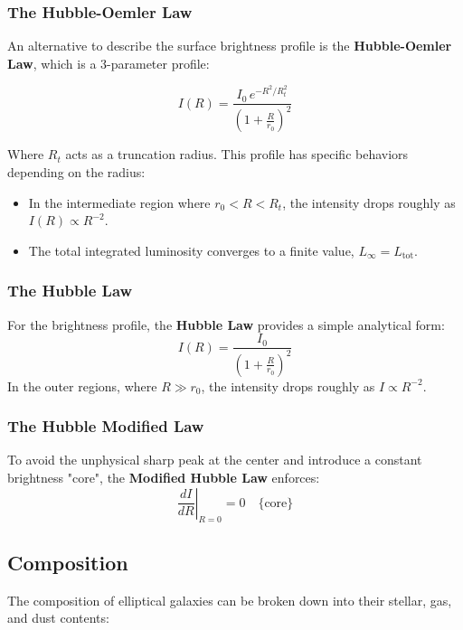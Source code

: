 \subsubsection{The Hubble-Oemler Law}

An alternative to describe the surface brightness profile is the \textbf{Hubble-Oemler Law}, which is a 3-parameter profile:

$$
I(R) = \frac{I_0 \, e^{-R^2/R_t^2}}{\left(1 + \frac{R}{r_0}\right)^2}
$$

Where $R_t$ acts as a truncation radius. This profile has specific behaviors depending on the radius:
\begin{itemize}
    \item In the intermediate region where $r_0 < R < R_t$, the intensity drops roughly as $I(R) \propto R^{-2}$.
    \item The total integrated luminosity converges to a finite value, $L_\infty = L_{\text{tot}}$.
\end{itemize}

\subsubsection{The Hubble Law}

For the brightness profile, the \textbf{Hubble Law} provides a simple analytical form:
$$
I(R) = \frac{I_0}{\left(1 + \frac{R}{r_0}\right)^2}
$$
In the outer regions, where $R \gg r_0$, the intensity drops roughly as $I \propto R^{-2}$.

\subsubsection{The Hubble Modified Law}

To avoid the unphysical sharp peak at the center and introduce a constant brightness "core", the \textbf{Modified Hubble Law} enforces:
$$
\left. \frac{dI}{dR} \right|_{R=0} = 0 \quad \text{\{core\}}
$$

\subsection{Composition}

The composition of elliptical galaxies can be broken down into their stellar, gas, and dust contents:

